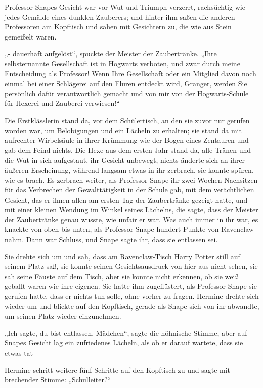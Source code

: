{Professor Snapes Gesicht war vor Wut und Triumph verzerrt, rachsüchtig wie jedes Gemälde eines dunklen Zauberers; und hinter ihm saßen die anderen Professoren am Kopftisch und sahen mit Gesichtern zu, die wie aus Stein gemeißelt waren.

„- dauerhaft aufgelöst“, spuckte der Meister der Zaubertränke. „Ihre selbsternannte Gesellschaft ist in Hogwarts verboten, und zwar durch meine Entscheidung als Professor! Wenn Ihre Gesellschaft oder ein Mitglied davon noch einmal bei einer Schlägerei auf den Fluren entdeckt wird, Granger, werden Sie persönlich dafür verantwortlich gemacht und von mir von der Hogwarts-Schule für Hexerei und Zauberei verwiesen!“

Die Erstklässlerin stand da, vor dem Schülertisch, an den sie zuvor nur gerufen worden war, um Belobigungen und ein Lächeln zu erhalten; sie stand da mit aufrechter Wirbelsäule in ihrer Krümmung wie der Bogen eines Zentauren und gab dem Feind nichts. Die Hexe aus dem ersten Jahr stand da, alle Tränen und die Wut in sich aufgestaut, ihr Gesicht unbewegt, nichts änderte sich an ihrer äußeren Erscheinung, während langsam etwas in ihr zerbrach, sie konnte spüren, wie es brach. Es zerbrach weiter, als Professor Snape ihr zwei Wochen Nachsitzen für das Verbrechen der Gewalttätigkeit in der Schule gab, mit dem verächtlichen Gesicht, das er ihnen allen am ersten Tag der Zaubertränke gezeigt hatte, und mit einer kleinen Wendung im Winkel seines Lächelns, die sagte, dass der Meister der Zaubertränke genau wusste, wie unfair er war. Was auch immer in ihr war, es knackte von oben bis unten, als Professor Snape hundert Punkte von Ravenclaw nahm. Dann war Schluss, und Snape sagte ihr, dass sie entlassen sei.

Sie drehte sich um und sah, dass am Ravenclaw-Tisch Harry Potter still auf seinem Platz saß, sie konnte seinen Gesichtsausdruck von hier aus nicht sehen, sie sah seine Fäuste auf dem Tisch, aber sie konnte nicht erkennen, ob sie weiß geballt waren wie ihre eigenen. Sie hatte ihm zugeflüstert, als Professor Snape sie gerufen hatte, dass er nichts tun solle, ohne vorher zu fragen. Hermine drehte sich wieder um und blickte auf den Kopftisch, gerade als Snape sich von ihr abwandte, um seinen Platz wieder einzunehmen.

„Ich sagte, du bist entlassen, Mädchen“, sagte die höhnische Stimme, aber auf Snapes Gesicht lag ein zufriedenes Lächeln, als ob er darauf wartete, dass sie etwas tat—

Hermine schritt weitere fünf Schritte auf den Kopftisch zu und sagte mit brechender Stimme: „Schulleiter?“

}

